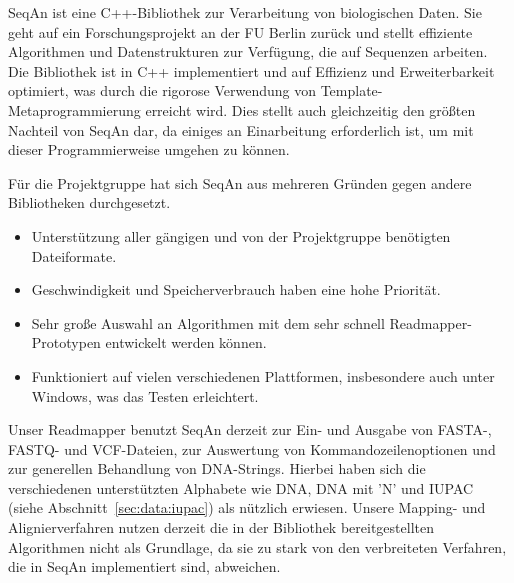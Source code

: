 SeqAn ist eine C++-Bibliothek zur Verarbeitung von biologischen Daten. Sie geht
auf ein Forschungsprojekt an der FU Berlin zurück und
stellt effiziente Algorithmen und Datenstrukturen zur Verfügung, die auf
Sequenzen arbeiten. Die Bibliothek ist in C++ implementiert und auf Effizienz
und Erweiterbarkeit optimiert, was durch die rigorose Verwendung von
Template-Metaprogrammierung erreicht wird. Dies stellt auch gleichzeitig den
größten Nachteil von SeqAn dar, da einiges an Einarbeitung erforderlich ist, um
mit dieser Programmierweise umgehen zu können.

Für die Projektgruppe hat sich SeqAn aus mehreren Gründen gegen andere
Bibliotheken durchgesetzt.

\begin{itemize}
	\item Unterstützung aller gängigen und von der Projektgruppe benötigten
          Dateiformate.
    \item Geschwindigkeit und Speicherverbrauch haben eine hohe Priorität.
	\item Sehr große Auswahl an Algorithmen mit dem sehr schnell
          Readmapper-Prototypen entwickelt werden können.
	\item Funktioniert auf vielen verschiedenen Plattformen, insbesondere
          auch unter Windows, was das Testen erleichtert.
\end{itemize}

Unser Readmapper benutzt SeqAn derzeit zur Ein- und Ausgabe von FASTA-,
FASTQ- und VCF-Dateien, zur Auswertung von Kommandozeilenoptionen und zur generellen
Behandlung von DNA-Strings. Hierbei haben sich die verschiedenen unterstützten
Alphabete wie DNA, DNA mit 'N' und IUPAC (siehe Abschnitt~\ref{sec:data:iupac}) als nützlich erwiesen.
Unsere Mapping- und Alignierverfahren nutzen derzeit die in der Bibliothek bereitgestellten Algorithmen nicht als Grundlage, da sie zu stark von den verbreiteten Verfahren, die in SeqAn implementiert sind, abweichen.
